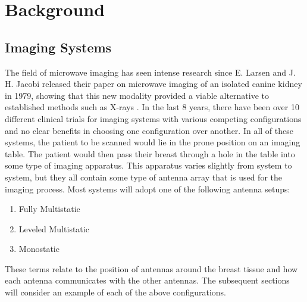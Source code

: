 \chapter*{Background}
\section{Imaging Systems}
The field of microwave imaging has seen intense research since E. Larsen and J. H. Jacobi released their paper on
microwave imaging of an isolated canine kidney in 1979, showing that this new modality provided a viable alternative to
established methods such as X-rays \cite{larsenMicrowaveScatteringParameter1979}. In the last 8 years, there have been
over 10 different clinical trials for imaging systems with various competing configurations and no clear benefits in
choosing one configuration over another. In all of these systems, the patient to be scanned would lie in the prone
position on an imaging table. The patient would then pass their breast through a hole in the table into some type of
imaging apparatus. This apparatus varies slightly from system to system, but they all contain some type of antenna array
that is used for the imaging process. Most systems will adopt one of the following antenna setups:
\begin{enumerate}
    \item Fully Multistatic
    \item Leveled Multistatic
    \item Monostatic
\end{enumerate}
\noindent These terms relate to the position of antennas around the breast tissue and how each antenna communicates with
the other antennas. The subsequent sections will consider an example of each of the above configurations.

